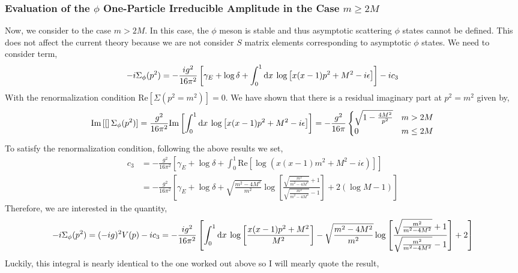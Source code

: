 \documentclass{article}
\begin{document}
\subsubsection{Evaluation of the $\phi$ One-Particle Irreducible Amplitude in the Case $m \ge 2 M$}

Now, we consider to the case $m > 2 M$. In this case, the $\phi$ meson is stable and thus asymptotic scattering $\phi$ states cannot be defined. This does not affect the current theory because we are not consider $S$ matrix elements corresponding to asymptotic $\phi$ states. We need to consider term,
\[ - i \Sigma_\phi(p^2) = - \frac{ig^2}{16 \pi^2}  \left[ \gamma_E + \log{\delta} + \int_{0}^{1} \mathrm{d}x \: \log{\left[ x(x-1)p^2 + M^2 - i \epsilon \right]} \right] - i c_3 \]
With the renormalization condition $\mathrm{Re}[\Sigma(p^2 = m^2)] = 0$. We have shown that there is a residual imaginary part at $p^2 = m^2$ given by,
\[\mathrm{Im}\left[ [ \right]\Sigma_\phi(p^2)] = \frac{g^2}{16 \pi^2} \mathrm{Im}\left[ \int_{0}^{1} \mathrm{d}x \: \log{\left[ x(x-1)p^2 + M^2 - i \epsilon \right]} \right] = -\frac{g^2}{16 \pi}
\begin{cases}
\sqrt{1 - \frac{4M^2}{p^2}} & m > 2M \\
0 & m \le 2M
\end{cases} \]
To satisfy the renormalization condition, following the above results we set,
\begin{align*}
c_3 & = - \frac{g^2}{16 \pi^2} \left[ \gamma_E + \log{\delta} + \int_0^1 \mathrm{Re}\left[ \log(x(x-1) m^2 + M^2 - i \epsilon) \right] \right] 
\\
&= - \frac{g^2}{16 \pi^2} \left[ \gamma_E + \log{\delta} + \sqrt{\frac{m^2 - 4 M^2}{m^2}} \log{\left[ \frac{\sqrt{\frac{m^2}{m^2 - 4 M^2}} + 1}{\sqrt{\frac{m^2}{m^2 - 4 M^2}} - 1} \right]} + 2( \log{M} - 1) \right]
\end{align*}
Therefore, we are interested in the quantity,
\[ - i \Sigma_\phi(p^2) = (-ig)^2 V(p) - i c_3 = - \frac{ig^2}{16 \pi^2} \left[ \int_{0}^{1} \mathrm{d}x \: \log{\left[\frac{x(x - 1) p^2 + M^2}{M^2} \right]} - \sqrt{\frac{m^2 - 4 M^2}{m^2}} \log{\left[ \frac{\sqrt{\frac{m^2}{m^2 - 4 M^2}} + 1}{\sqrt{\frac{m^2}{m^2 - 4 M^2}} - 1} \right]} + 2 \right] \]
Luckily, this integral is nearly identical to the one worked out above so I will mearly quote the result,
\end{document}
